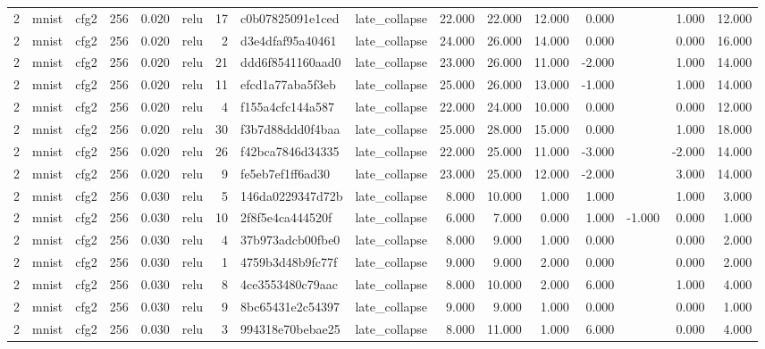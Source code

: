 \begin{table}[htbp]
{\begin{tabular}{@{}rllrrlrllrrrrrrr@{}}
2 & mnist & cfg2 & 256 & 0.020 & relu & 17 & c0b07825091e1ced & late\_collapse & 22.000 & 22.000 & 12.000 & 0.000 &  & 1.000 & 12.000 \\
2 & mnist & cfg2 & 256 & 0.020 & relu & 2 & d3e4dfaf95a40461 & late\_collapse & 24.000 & 26.000 & 14.000 & 0.000 &  & 0.000 & 16.000 \\
2 & mnist & cfg2 & 256 & 0.020 & relu & 21 & ddd6f8541160aad0 & late\_collapse & 23.000 & 26.000 & 11.000 & -2.000 &  & 1.000 & 14.000 \\
2 & mnist & cfg2 & 256 & 0.020 & relu & 11 & efcd1a77aba5f3eb & late\_collapse & 25.000 & 26.000 & 13.000 & -1.000 &  & 1.000 & 14.000 \\
2 & mnist & cfg2 & 256 & 0.020 & relu & 4 & f155a4cfc144a587 & late\_collapse & 22.000 & 24.000 & 10.000 & 0.000 &  & 0.000 & 12.000 \\
2 & mnist & cfg2 & 256 & 0.020 & relu & 30 & f3b7d88ddd0f4baa & late\_collapse & 25.000 & 28.000 & 15.000 & 0.000 &  & 1.000 & 18.000 \\
2 & mnist & cfg2 & 256 & 0.020 & relu & 26 & f42bca7846d34335 & late\_collapse & 22.000 & 25.000 & 11.000 & -3.000 &  & -2.000 & 14.000 \\
2 & mnist & cfg2 & 256 & 0.020 & relu & 9 & fe5eb7ef1ff6ad30 & late\_collapse & 23.000 & 25.000 & 12.000 & -2.000 &  & 3.000 & 14.000 \\
2 & mnist & cfg2 & 256 & 0.030 & relu & 5 & 146da0229347d72b & late\_collapse & 8.000 & 10.000 & 1.000 & 1.000 &  & 1.000 & 3.000 \\
2 & mnist & cfg2 & 256 & 0.030 & relu & 10 & 2f8f5e4ca444520f & late\_collapse & 6.000 & 7.000 & 0.000 & 1.000 & -1.000 & 0.000 & 1.000 \\
2 & mnist & cfg2 & 256 & 0.030 & relu & 4 & 37b973adcb00fbe0 & late\_collapse & 8.000 & 9.000 & 1.000 & 0.000 &  & 0.000 & 2.000 \\
2 & mnist & cfg2 & 256 & 0.030 & relu & 1 & 4759b3d48b9fc77f & late\_collapse & 9.000 & 9.000 & 2.000 & 0.000 &  & 0.000 & 2.000 \\
2 & mnist & cfg2 & 256 & 0.030 & relu & 8 & 4ce3553480c79aac & late\_collapse & 8.000 & 10.000 & 2.000 & 6.000 &  & 1.000 & 4.000 \\
2 & mnist & cfg2 & 256 & 0.030 & relu & 9 & 8bc65431e2c54397 & late\_collapse & 9.000 & 9.000 & 1.000 & 0.000 &  & 0.000 & 1.000 \\
2 & mnist & cfg2 & 256 & 0.030 & relu & 3 & 994318e70bebae25 & late\_collapse & 8.000 & 11.000 & 1.000 & 6.000 &  & 0.000 & 4.000 \\

\end{tabular}}
\end{table}
